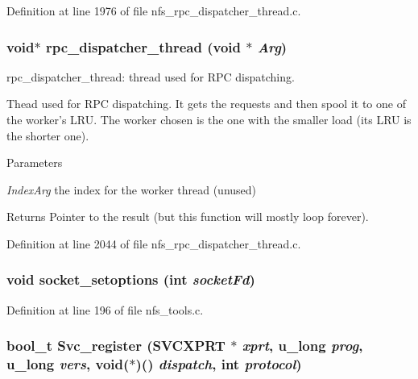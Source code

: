 Definition at line 1976 of file nfs\_\-rpc\_\-dispatcher\_\-thread.c.
\subsubsection[{rpc\_\-dispatcher\_\-thread}]{\setlength{\rightskip}{0pt plus 5cm}void$\ast$ rpc\_\-dispatcher\_\-thread (void $\ast$ {\em Arg})}\label{nfs__rpc__dispatcher__thread_8c_a9e303488e5f50b512b89ba77ef8553e4}
rpc\_\-dispatcher\_\-thread: thread used for RPC dispatching.

Thead used for RPC dispatching. It gets the requests and then spool it to one of the worker's LRU. The worker chosen is the one with the smaller load (its LRU is the shorter one).


\begin{DoxyParams}{Parameters}
\item[{\em IndexArg}]the index for the worker thread (unused)\end{DoxyParams}
\begin{DoxyReturn}{Returns}
Pointer to the result (but this function will mostly loop forever). 
\end{DoxyReturn}


Definition at line 2044 of file nfs\_\-rpc\_\-dispatcher\_\-thread.c.
\subsubsection[{socket\_\-setoptions}]{\setlength{\rightskip}{0pt plus 5cm}void socket\_\-setoptions (int {\em socketFd})}\label{nfs__rpc__dispatcher__thread_8c_a724cb81161f478d63c680f3e1f3f3a62}


Definition at line 196 of file nfs\_\-tools.c.
\subsubsection[{Svc\_\-register}]{\setlength{\rightskip}{0pt plus 5cm}bool\_\-t Svc\_\-register (SVCXPRT $\ast$ {\em xprt}, \/  u\_\-long {\em prog}, \/  u\_\-long {\em vers}, \/  void($\ast$)() {\em dispatch}, \/  int {\em protocol})}\label{nfs__rpc__dispatcher__thread_8c_adceb1bd7fe39115fff57535f517f5d3e}


